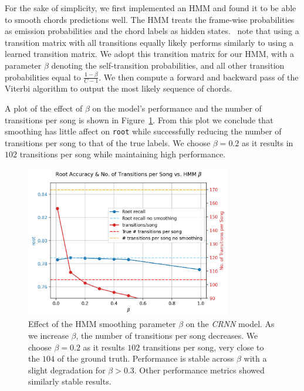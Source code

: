 For the sake of simplicity, we first implemented an HMM and found it to be able to smooth chords predictions well. The HMM treats the frame-wise probabilities as emission probabilities and the chord labels as hidden states.~\citet{CQTvsChroma} note that using a transition matrix with all transitions equally likely performs similarly to using a learned transition matrix. We adopt this transition matrix for our HMM, with a parameter $\beta$ denoting the self-transition probabilities, and all other transition probabilities equal to $\frac{1-\beta}{C-1}$. We then compute a forward and backward pass of the Viterbi algorithm to output the most likely sequence of chords.

A plot of the effect of $\beta$ on the model's performance and the number of transitions per song is shown in Figure~\ref{fig:hmm_beta_search}. From this plot we conclude that smoothing has little affect on \texttt{root} while successfully reducing the number of transitions per song to that of the true labels. We choose $\beta = 0.2$ as it results in $102$ transitions per song while maintaining high performance.

\begin{figure}[H]
    \centering
    \includegraphics[width=0.8\textwidth]{figures/hmm_beta_vs_root_transitions.png}
    \caption{Effect of the HMM smoothing parameter $\beta$ on the \emph{CRNN} model. As we increase $\beta$, the number of transitions per song decreases. We choose $\beta = 0.2$ as it results $102$ transitions per song, very close to the $104$ of the ground truth. Performance is stable across $\beta$ with a slight degradation for $\beta > 0.3$. Other performance metrics showed similarly stable results. }\label{fig:hmm_beta_search}
\end{figure}


